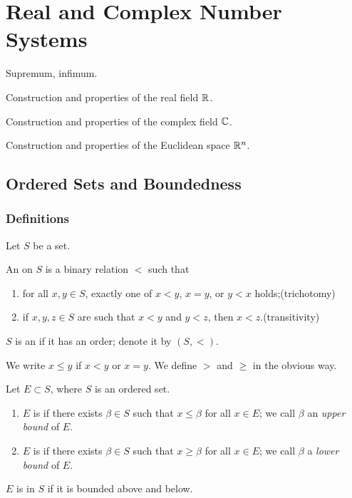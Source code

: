 \chapter{Real and Complex Number Systems}\label{chap:number-systems}

\begin{summary}
\item Supremum, infimum.
\item Construction and properties of the real field $\mathbb R$.
\item Construction and properties of the complex field $\mathbb C$.
\item Construction and properties of the Euclidean space $\mathbb R^n$.
\end{summary}

\section{Ordered Sets and Boundedness}
\subsection{Definitions}
Let $S$ be a set.
\begin{definition}
An  on $S$ is a binary relation $<$ such that
\begin{enumerate}[label=(\roman*)]
\item for all $x,y\in S$, exactly one of $x<y$, $x=y$, or $y<x$ holds;\hfill(trichotomy)
\item if $x,y,z\in S$ are such that $x<y$ and $y<z$, then $x<z$.\hfill(transitivity)
\end{enumerate}
$S$ is an  if it has an order; denote it by $(S,<)$.
\end{definition}

\begin{notation}
We write $x\le y$ if $x<y$ or $x=y$. We define $>$ and $\ge$ in the obvious way.
\end{notation}

\begin{definition}[Boundedness]
Let $E\subset S$, where $S$ is an ordered set.
\begin{enumerate}[label=(\roman*)]
\item $E$ is  if there exists $\beta\in S$ such that $x\le\beta$ for all $x\in E$; we call $\beta$ an \emph{upper bound} of $E$.
\item $E$ is  if there exists $\beta\in S$ such that $x\ge\beta$ for all $x\in E$; we call $\beta$ a \emph{lower bound} of $E$.
\end{enumerate}
$E$ is  in $S$ if it is bounded above and below.
\end{definition}

